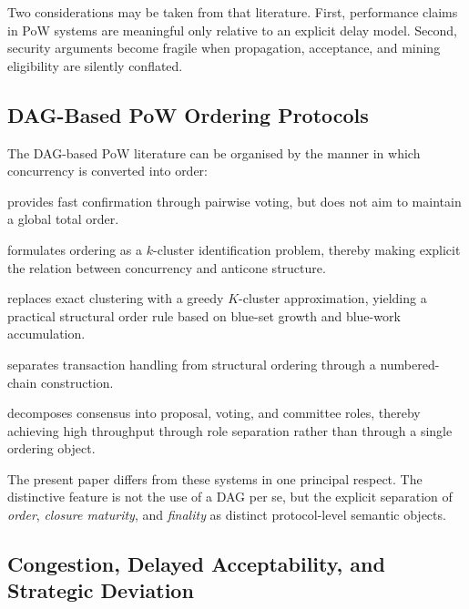 \documentclass[11pt]{article}
\theoremstyle{definition}
\theoremstyle{plain}
\theoremstyle{remark}
\begin{document}
Two considerations may be taken from that literature.
First, performance claims in PoW systems are meaningful only relative to an
explicit delay model.
Second, security arguments become fragile when propagation, acceptance, and
mining eligibility are silently conflated.

\subsection{DAG-Based PoW Ordering Protocols}

The DAG-based PoW literature can be organised by the manner in which
concurrency is converted into order:
\begin{description}[nosep]
    \item[SPECTRE~\cite{sompolinsky2016spectre}] provides fast confirmation
    through pairwise voting, but does not aim to maintain a global total order.

    \item[PHANTOM~\cite{sompolinsky2018phantom}] formulates ordering as a
    $k$-cluster identification problem, thereby making explicit the relation
    between concurrency and anticone structure.

    \item[GhostDAG~\cite{sompolinsky2021ghostdag}] replaces exact clustering
    with a greedy $K$-cluster approximation, yielding a practical structural
    order rule based on blue-set growth and blue-work accumulation.

    \item[OHIE~\cite{yu2021ohie}] separates transaction handling from
    structural ordering through a numbered-chain construction.

    \item[Prism~\cite{bagaria2019prism}] decomposes consensus into proposal,
    voting, and committee roles, thereby achieving high throughput through
    role separation rather than through a single ordering object.
\end{description}

The present paper differs from these systems in one principal respect.
The distinctive feature is not the use of a DAG per se, but the explicit
separation of \emph{order}, \emph{closure maturity}, and \emph{finality} as
distinct protocol-level semantic objects.

\subsection{Congestion, Delayed Acceptability, and Strategic Deviation}
\end{document}
